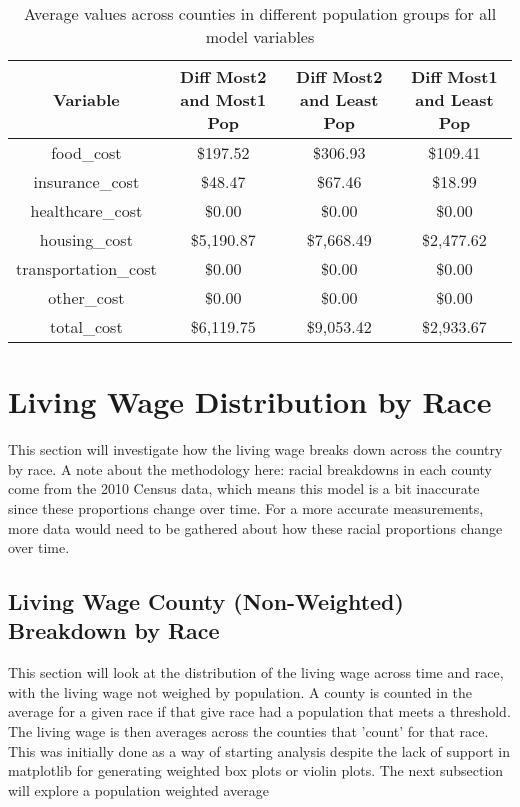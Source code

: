 \begin{table}[H]
\centering
 \begin{tabular}{||c c c c||} 
 \hline
 Variable & Diff Most2 and Most1 Pop	& Diff Most2 and Least Pop & Diff Most1 and Least Pop \\ [0.5ex] 
 \hline\hline
 food\_cost & \$197.52 & \$306.93 & \$109.41 \\ 
 insurance\_cost & \$48.47 & \$67.46 & \$18.99 \\
 healthcare\_cost & \$0.00 &	\$0.00 & \$0.00 \\
 housing\_cost &	\$5,190.87 &	\$7,668.49 &	 \$2,477.62 \\
 transportation\_cost & \$0.00 & \$0.00 & \$0.00 \\
 other\_cost & \$0.00 & \$0.00 & \$0.00 \\
 total\_cost & \$6,119.75 & \$9,053.42 & \$2,933.67 \\ [1ex] 
 \hline
 \end{tabular}
 \caption{Average values across counties in different population groups for all model variables}
 \label{tab:ch4_table_variable_delta_by_population}
\end{table}




\section{Living Wage Distribution by Race}

This section will investigate how the living wage breaks down across the country by race. A note about the methodology here: racial breakdowns in each county come from the 2010 Census data, which means this model is a bit inaccurate since these proportions change over time. For a more accurate measurements, more data would need to be gathered about how these racial proportions change over time.

\subsection{Living Wage County (Non-Weighted) Breakdown by Race}

This section will look at the distribution of the living wage across time and race, with the living wage not weighed by population. A county is counted in the average for a given race if that give race had a population that meets a threshold. The living wage is then averages across the counties that 'count' for that race. This was initially done as a way of starting analysis despite the lack of support in matplotlib for generating weighted box plots or violin plots. The next subsection will explore a population weighted average

